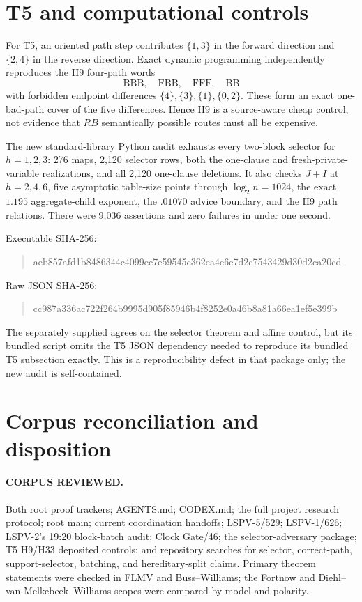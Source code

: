 \documentclass[11pt]{article}
\begin{document}
\section{T5 and computational controls}

For T5, an oriented path step contributes $\{1,3\}$ in the forward direction and $\{2,4\}$ in the reverse direction.  Exact dynamic programming independently reproduces the H9 four-path words
\[
 \mathrm{BBB},\quad\mathrm{FBB},\quad\mathrm{FFF},\quad\mathrm{BB}
\]
with forbidden endpoint differences $\{4\},\{3\},\{1\},\{0,2\}$.  These form an exact one-bad-path cover of the five differences.  Hence H9 is a source-aware cheap control, not evidence that $RB$ semantically possible routes must all be expensive.

The new standard-library Python audit exhausts every two-block selector for $h=1,2,3$: 276 maps, 2,120 selector rows, both the one-clause and fresh-private-variable realizations, and all 2,120 one-clause deletions.  It also checks $J+I$ at $h=2,4,6$, five asymptotic table-size points through $\log_2n=1024$, the exact $1.195$ aggregate-child exponent, the $.01070$ advice boundary, and the H9 path relations.  There were 9,036 assertions and zero failures in under one second.

Executable SHA-256:
\begin{quote}\ttfamily aeb857afd1b8486344c4099ec7e59545c362ea4e6e7d2c7543429d30d2ca20cd\end{quote}
Raw JSON SHA-256:
\begin{quote}\ttfamily cc987a336ac722f264b9995d905f85946b4f8252e0a46b8a81a66ea1ef5e399b\end{quote}

The separately supplied  agrees on the selector theorem and affine control, but its bundled script omits the T5 JSON dependency needed to reproduce its bundled T5 subsection exactly.  This is a reproducibility defect in that package only; the new audit is self-contained.

\section{Corpus reconciliation and disposition}

\paragraph{CORPUS REVIEWED.}
Both root proof trackers; AGENTS.md; CODEX.md; the full project research protocol; root main; current coordination handoffs; LSPV-5/529; LSPV-1/626; LSPV-2's 19:20 block-batch audit; Clock Gate/46; the selector-adversary package; T5 H9/H33 deposited controls; and repository searches for selector, correct-path, support-selector, batching, and hereditary-split claims.  Primary theorem statements were checked in FLMV and Buss--Williams; the Fortnow and Diehl--van Melkebeek--Williams scopes were compared by model and polarity.
\end{document}
